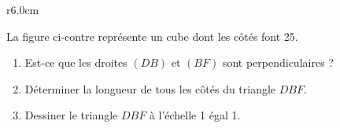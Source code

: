 
\begin{exercice}\label{exoSeconde-0094}

\begin{wrapfigure}{r}{6.0cm}
   \vspace{-1cm}        %
   \centering
   
\end{wrapfigure}

        La figure ci-contre représente un cube dont les côtés font \unit{25}{\meter}. 
        \begin{enumerate}
            \item
        Est-ce que les droites \( (DB)\) et \( (BF)\) sont perpendiculaires ?
    \item
        Déterminer la longueur de tous les côtés du triangle \( DBF\).
    \item
        Dessiner le triangle \( DBF\) à l'échelle \unit{1}{\centi\meter} égal \unit{1}{\meter}.
        \end{enumerate}
        
\end{exercice}
